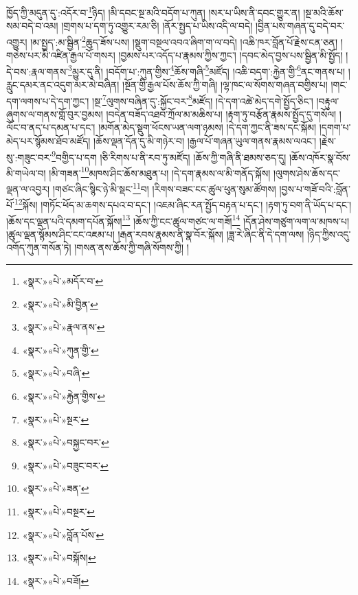 \documentclass[12pt,a4paper]{book}
\begin{document}
ཁྱོད་ཀྱི་མདུན་དུ་:འདོར་བ་\footnote{«སྣར་»«པེ་»མདོར་བ་}ཉིད། །མི་དབང་སྔ་མའི་བདོག་པ་ཀུན། །སར་པ་ཡིས་ནི་དབང་གྱུར་ན། །སྔ་མའི་ཆོས་སམ་བདེ་བ་འམ། །གྲགས་པ་དག་ཏུ་འགྱུར་རམ་ཅི། །ནོར་སྤྱད་པ་ཡིས་འདི་ལ་བདེ། །བྱིན་པས་གཞན་དུ་བདེ་བར་འགྱུར། །མ་སྤྱད་:མ་སྦྱིན་\footnote{«སྣར་»«པེ་»མི་བྱིན་}ཆུད་ཟོས་པས། །སྡུག་བསྔལ་འབའ་ཞིག་ག་ལ་བདེ། །འཆི་ཁར་བློན་པོ་རྗེས་ངན་ཅན། །གཅེས་པར་མི་འཛིན་རྒྱལ་པོ་གསར། །བྱམས་པར་འདོད་པ་རྣམས་ཀྱིས་ཀྱང་། །དབང་མེད་བྱས་པས་སྦྱིན་མི་སྤྱོད། །དེ་བས་:རྣལ་གནས་\footnote{«སྣར་»«པེ་»རྣལ་ནས་}མྱུར་དུ་ནི། །བདོག་པ་:ཀུན་གྱིས་\footnote{«སྣར་»«པེ་»ཀུན་གྱི་}ཆོས་གཞི་\footnote{«སྣར་»«པེ་»བཞི་}མཛོད། །འཆི་བདག་:རྐྱེན་གྱི་\footnote{«སྣར་»«པེ་»རྐྱེན་གྱིས་}ནང་གནས་པ། །རླུང་དམར་ནང་འདུག་མར་མེ་བཞིན། །སྔོན་གྱི་རྒྱལ་པོས་ཆོས་ཀྱི་གཞི། །ལྷ་ཁང་ལ་སོགས་གཞན་བགྱིས་པ། །གང་དག་ལགས་པ་དེ་དག་ཀྱང་། །སྔ་\footnote{«སྣར་»«པེ་»སྔར་}ལུགས་བཞིན་དུ་:སྐྱོང་བར་\footnote{«སྣར་»«པེ་»བསྐྱང་བར་}མཛོད། །དེ་དག་འཚེ་མེད་དགེ་སྤྱོད་ཅིང་། །བརྟུལ་ཞུགས་ལ་གནས་གློ་བུར་བྱམས། །བདེན་བཟོད་འཐབ་ཀྲོལ་མ་མཆིས་པ། །རྟག་ཏུ་བརྩོན་རྣམས་སྤྱོད་དུ་གསོལ། །ལོང་བ་ནད་པ་དམན་པ་དང་། །མགོན་མེད་སྡུག་ཕོངས་ཡན་ལག་ཉམས། །དེ་དག་ཀྱང་ནི་ཟས་དང་སྐོམ། །དགག་པ་མེད་པར་སྙོམས་ཐོབ་མཛོད། །ཆོས་ལྡན་དོན་དུ་མི་གཉེར་བ། །རྒྱལ་པོ་གཞན་ཡུལ་གནས་རྣམས་ལའང་། །རྗེས་སུ་:གཟུང་བར་\footnote{«སྣར་»«པེ་»བཟུང་བར་}བགྱིད་པ་དག །ཅི་རིགས་པ་ནི་རབ་ཏུ་མཛོད། །ཆོས་ཀྱི་གཞི་ནི་ཐམས་ཅད་དུ། །ཆོས་འཁོར་སྣ་བོས་མི་གཡེལ་བ། །མི་གཟན་\footnote{«སྣར་»«པེ་»ཟན་}མཁས་ཤིང་ཆོས་མཐུན་པ། །དེ་དག་རྣམས་ལ་མི་གནོད་སྐོས། །ལུགས་ཤེས་ཆོས་དང་ལྡན་ལ་འབྱར། །གཙང་ཞིང་སྙིང་ཉེ་མི་སྡང་\footnote{«སྣར་»«པེ་»བསྔར་}བ། །རིགས་བཟང་ངང་ཚུལ་ཕུན་སུམ་ཚོགས། །བྱས་པ་གཟོ་བའི་:བློན་པོ་\footnote{«སྣར་»«པེ་»བློན་པོས་}སྐོས། །གཏོང་ཕོད་མ་ཆགས་དཔའ་བ་དང་། །འཇམ་ཞིང་རན་སྤྱོད་བརྟན་པ་དང་། །རྟག་ཏུ་བག་ནི་ཡོད་པ་དང་། །ཆོས་དང་ལྡན་པའི་དམག་དཔོན་སྐོས།\footnote{«སྣར་»«པེ་»བསྐོས།} །ཆོས་ཀྱི་ངང་ཚུལ་གཙང་ལ་གཟོ།\footnote{«སྣར་»«པེ་»བཟོ།} །དོན་ཤེས་གཙུག་ལག་ལ་མཁས་པ། །ཚུལ་ལྡན་སྙོམས་ཤིང་ངང་འཇམ་པ། །རྒན་རབས་རྣམས་ནི་སྣ་བོར་སྐོས། །ཟླ་རེ་ཞིང་ནི་དེ་དག་ལས། །ཉིད་ཀྱིས་འདུ་འགོད་ཀུན་གསོན་ཏེ། །གསན་ནས་ཆོས་ཀྱི་གཞི་སོགས་ཀྱི། །
\end{document}
